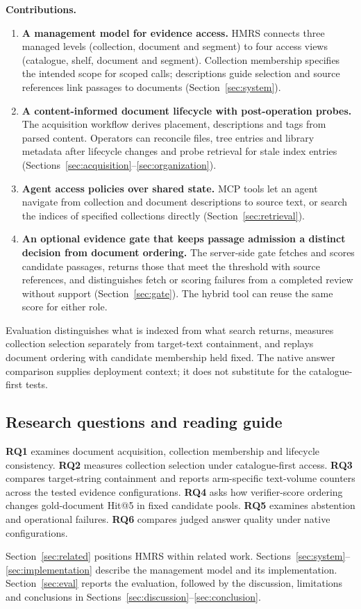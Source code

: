 \noindent\textbf{Contributions.}
\begin{enumerate}
\item \textbf{A management model for evidence access.} HMRS connects
three managed levels (collection, document and segment) to four access
views (catalogue, shelf, document and segment). Collection membership
specifies the intended scope for scoped calls; descriptions guide selection
and source references link passages to documents (Section~\ref{sec:system}).
\item \textbf{A content-informed document lifecycle with post-operation
probes.} The acquisition workflow derives placement, descriptions and
tags from parsed content. Operators can reconcile files, tree entries
and library metadata after lifecycle changes and probe retrieval for
stale index entries
(Sections~\ref{sec:acquisition}--\ref{sec:organization}).
\item \textbf{Agent access policies over shared state.} MCP tools let an
agent navigate from collection and document descriptions to source text,
or search the indices of specified collections directly
(Section~\ref{sec:retrieval}).
\item \textbf{An optional evidence gate that keeps passage admission a
distinct decision from document ordering.} The server-side gate fetches and scores candidate
passages, returns those that meet the threshold with source references, and
distinguishes fetch or scoring failures from a completed review without
support (Section~\ref{sec:gate}). The hybrid tool can reuse the same score
for either role.
\end{enumerate}

Evaluation distinguishes what is indexed from what search returns,
measures collection selection separately from target-text containment, and
replays document ordering with candidate membership held fixed. The native
answer comparison supplies deployment context; it does not substitute for the
catalogue-first tests.

\subsection{Research questions and reading guide}
\label{sec:rq}

 \textbf{RQ1} examines document acquisition, collection membership and
lifecycle consistency. \textbf{RQ2} measures collection selection under
catalogue-first access. \textbf{RQ3} compares target-string containment
and reports arm-specific text-volume counters across the tested evidence
configurations.
\textbf{RQ4} asks how verifier-score ordering changes gold-document
Hit@5 in fixed candidate pools. \textbf{RQ5} examines abstention and
operational failures. \textbf{RQ6} compares judged answer quality under
native configurations.

Section~\ref{sec:related} positions HMRS within related work.
Sections~\ref{sec:system}--\ref{sec:implementation} describe the management
model and its implementation. Section~\ref{sec:eval} reports the evaluation,
followed by the discussion, limitations and conclusions in
Sections~\ref{sec:discussion}--\ref{sec:conclusion}.
